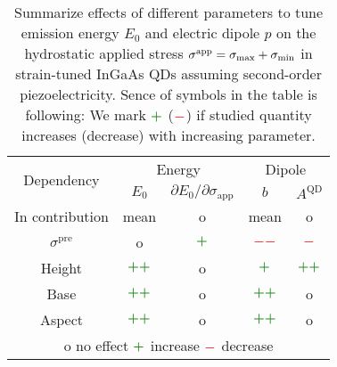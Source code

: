 \begin{table*}[ht!]
	\begin{center}
		\caption{Summarize effects of different parameters to tune emission energy $E_0$ and electric dipole $p$ on the hydrostatic applied stress $\sigma^{\rm{app}}=\sigma_{\mathrm{max}}+\sigma_{\mathrm{min}}$ in strain-tuned InGaAs QDs assuming second-order piezoelectricity. Sence of symbols in the table is following: We mark $\textcolor{ps_green}{\boldsymbol{+}}$ ($\textcolor{red}{\boldsymbol{-}}$) if studied quantity increases (decrease) with increasing parameter.  \label{tab:conclusion_straintuned} 
		}
		\begin{tabular}{c|cc|cc}
			\hline \hline
			\multirow{2}{*}{Dependency} &  \multicolumn{2}{c|}{Energy} & \multicolumn{2}{c}{Dipole}\\ \cline{2-5}
			 &   $E_0$ & $\partial E_0/\partial\sigma_\mathrm{app}$  & $b$ & $A^{\mathrm{QD}}$\\  \hline
			  In contribution &  mean & o  & mean &o\\ \hline
			 $\sigma^\mathrm{pre}$ &  o &  $\textcolor{ps_green}{\boldsymbol{+}}$  & $\textcolor{red}{\boldsymbol{--}}$ &$\textcolor{red}{\boldsymbol{-}}$\\ \hline
			 Height&  $\textcolor{ps_green}{\boldsymbol{++}}$&  o  & $\textcolor{ps_green}{\boldsymbol{+}}$ &$\textcolor{ps_green}{\boldsymbol{++}}$\\ \hline
			 Base &  $\textcolor{ps_green}{\boldsymbol{++}}$&  o   &$\textcolor{ps_green}{\boldsymbol{++}}$ & o\\ \hline
			 Aspect &  $\textcolor{ps_green}{\boldsymbol{++}}$&  o   &$\textcolor{ps_green}{\boldsymbol{++}}$ & o\\ \hline
			 \multicolumn{5}{c}{o no effect \qquad $\textcolor{ps_green}{\boldsymbol{+}}$ increase \qquad $\textcolor{red}{\boldsymbol{-}}$ decrease }\\
			\hline \hline
		\end{tabular}
	\end{center}
\end{table*}


